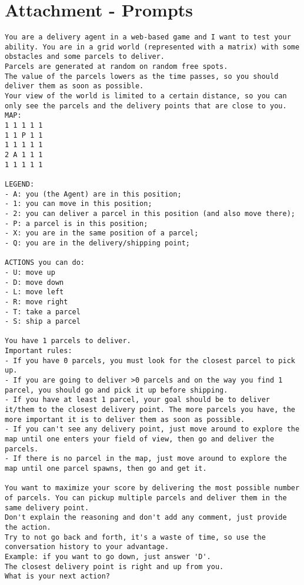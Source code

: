 \chapter{Attachment - Prompts}
\label{cha:attachment}
\clearpage
\begin{codewindow}
  [Prompt]  \begin{lstlisting}
You are a delivery agent in a web-based game and I want to test your ability. You are in a grid world (represented with a matrix) with some obstacles and some parcels to deliver.
Parcels are generated at random on random free spots.
The value of the parcels lowers as the time passes, so you should deliver them as soon as possible.
Your view of the world is limited to a certain distance, so you can only see the parcels and the delivery points that are close to you.
MAP:
1 1 1 1 1
1 1 P 1 1
1 1 1 1 1
2 A 1 1 1
1 1 1 1 1

LEGEND:
- A: you (the Agent) are in this position;
- 1: you can move in this position;
- 2: you can deliver a parcel in this position (and also move there);
- P: a parcel is in this position;
- X: you are in the same position of a parcel;
- Q: you are in the delivery/shipping point;

ACTIONS you can do:
- U: move up
- D: move down
- L: move left
- R: move right
- T: take a parcel
- S: ship a parcel

You have 1 parcels to deliver.
Important rules:
- If you have 0 parcels, you must look for the closest parcel to pick up.
- If you are going to deliver >0 parcels and on the way you find 1 parcel, you should go and pick it up before shipping.
- If you have at least 1 parcel, your goal should be to deliver it/them to the closest delivery point. The more parcels you have, the more important it is to deliver them as soon as possible.
- If you can't see any delivery point, just move around to explore the map until one enters your field of view, then go and deliver the parcels.
- If there is no parcel in the map, just move around to explore the map until one parcel spawns, then go and get it.

You want to maximize your score by delivering the most possible number of parcels. You can pickup multiple parcels and deliver them in the same delivery point.
Don't explain the reasoning and don't add any comment, just provide the action.
Try to not go back and forth, it's a waste of time, so use the conversation history to your advantage.
Example: if you want to go down, just answer 'D'.
The closest delivery point is right and up from you.
What is your next action?
\end{lstlisting}
\end{codewindow}

